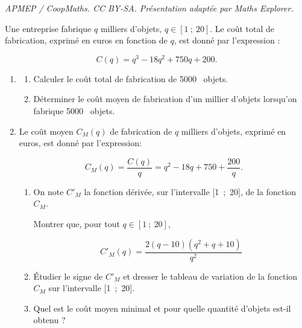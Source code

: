 \documentclass[10pt]{article}
\providecommand{\np}[2][]{{#2~#1}}
\begin{document}
\noindent\textit{APMEP / CoopMaths. CC BY-SA. Présentation adaptée par Maths Explorer.}\par\medskip
\medskip

Une entreprise fabrique $q$ milliers d'objets, $q \in [1~;~20]$. Le coût total de fabrication, exprimé en euros en fonction de $q$, est donné par l'expression :

\[C(q) = q^3 - 18q^2 +750q + 200.\]

\begin{enumerate}
\item 
	\begin{enumerate}
		\item Calculer le coût total de fabrication de \np{5000} objets.
		\item Déterminer le coût moyen de fabrication d'un millier d'objets lorsqu'on fabrique \np{5000} objets.
	\end{enumerate}
\item Le coût moyen $C_M(q)$ de fabrication de $q$ milliers d'objets, exprimé en euros, est donné par l'expression:

\[C_M(q) = \dfrac{C(q)}{q}   = q^2 - 18q + 750 + \dfrac{ 200}{q}.\]
 
	\begin{enumerate}
		\item On note $C'_M$ la fonction dérivée, sur l'intervalle [1~;~20], de la fonction $C_M$.
		
 Montrer que, pour tout $q \in [1~;~20]$,

\[C'_M(q) = \dfrac{2(q - 10)\left(q^2 + q + 10\right)}{q^2}\]

		\item Étudier le signe de $C'_M$ et dresser le tableau de variation de la fonction $C_M$ sur l'intervalle [1~;~20].
		\item Quel est le coût moyen minimal et pour quelle quantité d'objets est-il obtenu ?
	\end{enumerate}
\end{enumerate}

\bigskip
\end{document}
